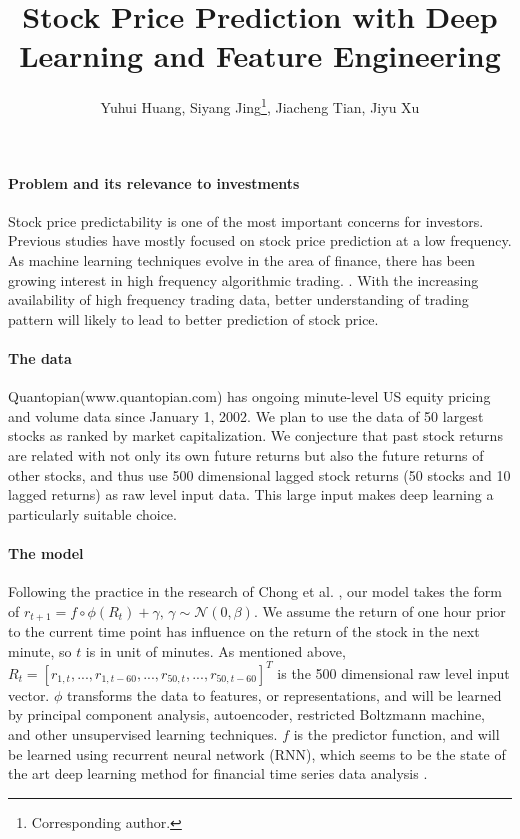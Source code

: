 \documentclass{article}
\title{Stock Price Prediction with Deep Learning and Feature Engineering}
\author{Yuhui Huang, Siyang Jing\thanks{Corresponding author.}, Jiacheng Tian, Jiyu Xu}
\begin{document}
\maketitle
\paragraph{Problem and its relevance to investments}
Stock price predictability is one of the most important concerns for investors. Previous studies have mostly focused on stock price prediction at a low frequency. As machine learning techniques evolve in the area of finance, there has been growing interest in high frequency algorithmic trading. \cite{Kearns2013}. With the increasing availability of high frequency trading data, better understanding of trading pattern will likely to lead to better prediction of stock price.

\paragraph{The data}
Quantopian(www.quantopian.com) has ongoing minute-level US equity pricing and volume data since January 1, 2002. We plan to use the data of 50 largest stocks as ranked by market capitalization. We conjecture that past stock returns are related with not only its own future returns but also the future returns of other stocks, and thus use 500 dimensional lagged stock returns (50 stocks and 10 lagged returns) as raw level input data. This large input makes deep learning a particularly suitable choice.

\paragraph{The model}
Following the practice in the research of Chong et al. \cite{Chong2017}, our model takes the form of
$r_{t+1}=f\circ\phi(R_t)+\gamma,\,\gamma\sim\mathcal{N}(0,\beta)$.
We assume the return of one hour prior to the current time point has influence on the return of the stock in the next minute, so $t$ is in unit of minutes. As mentioned above, $R_t = [r_{1,t},...,r_{1,t-60},...,r_{50,t},...,r_{50,t-60}]^T$ is the 500 dimensional raw level input vector. $\phi$ transforms the data to features, or representations, and will be learned by principal component analysis, autoencoder, restricted Boltzmann machine, and other unsupervised learning techniques. $f$ is the predictor function, and will be learned using recurrent neural network (RNN), which seems to be the state of the art deep learning method for financial time series data analysis \cite{Abe2018}.
\end{document}

